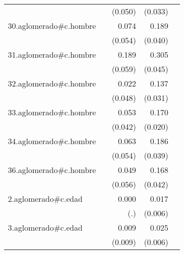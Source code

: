 {\begin{longtable}{l*{4}{D{.}{.}{-1}}}
            &                     &     (0.050)         &     (0.033)         &                     \\
\addlinespace
30.aglomerado#c.hombre&                     &       0.074         &       0.189\sym{***}&                     \\
            &                     &     (0.054)         &     (0.040)         &                     \\
\addlinespace
31.aglomerado#c.hombre&                     &       0.189\sym{**} &       0.305\sym{***}&                     \\
            &                     &     (0.059)         &     (0.045)         &                     \\
\addlinespace
32.aglomerado#c.hombre&                     &       0.022         &       0.137\sym{***}&                     \\
            &                     &     (0.048)         &     (0.031)         &                     \\
\addlinespace
33.aglomerado#c.hombre&                     &       0.053         &       0.170\sym{***}&                     \\
            &                     &     (0.042)         &     (0.020)         &                     \\
\addlinespace
34.aglomerado#c.hombre&                     &       0.063         &       0.186\sym{***}&                     \\
            &                     &     (0.054)         &     (0.039)         &                     \\
\addlinespace
36.aglomerado#c.hombre&                     &       0.049         &       0.168\sym{***}&                     \\
            &                     &     (0.056)         &     (0.042)         &                     \\
\addlinespace
2.aglomerado#c.edad&                     &       0.000         &       0.017\sym{**} &                     \\
            &                     &         (.)         &     (0.006)         &                     \\
\addlinespace
3.aglomerado#c.edad&                     &       0.009         &       0.025\sym{***}&                     \\
            &                     &     (0.009)         &     (0.006)         &                     \\

\end{longtable}}
